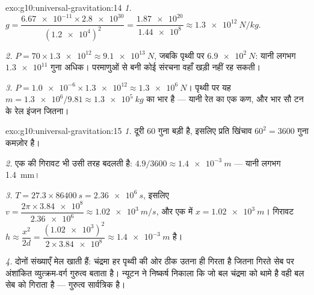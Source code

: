 \begin{solution}{exo:g10:universal-gravitation:14}
\emph{1.} $g = \dfrac{\num{6.67e-11} \times \num{2.8e30}}
{(\num{1.2e4})^2} = \dfrac{\num{1.87e20}}{\num{1.44e8}}
\approx \qty{1.3e12}{N/kg}.$

\emph{2.} $P = 70 \times \num{1.3e12} \approx \qty{9.1e13}{N}$, जबकि पृथ्वी पर $\qty{6.9e2}{N}$: यानी लगभग $\num{1.3e11}$ गुना अधिक।
परमाणुओं से बनी कोई संरचना वहाँ खड़ी नहीं रह सकती।

\emph{3.} $P = \num{1.0e-6} \times \num{1.3e12} \approx
\qty{1.3e6}{N}$। पृथ्वी पर यह $m = \num{1.3e6}/9.81 \approx \qty{1.3e5}{kg}$ का भार है --- यानी रेत का
एक कण, और भार सौ टन के रेल इंजन जितना।
\end{solution}

\begin{solution}{exo:g10:universal-gravitation:15}
\emph{1.} दूरी $60$ गुना बड़ी है, इसलिए प्रति 
खिंचाव $60^2 = 3600$ गुना कमज़ोर है।

\emph{2.} एक  की गिरावट भी उसी तरह बदलती है: $4.9/3600 \approx \qty{1.4e-3}{m}$ --- यानी लगभग
\qty{1.4}{mm}।

\emph{3.} $T = 27.3 \times \qty{86400}{s} = \qty{2.36e6}{s}$, इसलिए $v = \dfrac{2\pi \times \num{3.84e8}}{\num{2.36e6}} \approx
\qty{1.02e3}{m/s}$, और एक  में $x = \qty{1.02e3}{m}$। गिरावट
$h \approx \dfrac{x^2}{2d}
= \dfrac{(\num{1.02e3})^2}{2 \times \num{3.84e8}}
\approx \qty{1.4e-3}{m}$ है।

\emph{4.} दोनों संख्याएँ मेल खाती हैं: चंद्रमा हर  पृथ्वी की ओर ठीक
उतना ही गिरता है जितना गिरते सेब पर अंशांकित व्युत्क्रम-वर्ग गुरुत्व
बताता है। न्यूटन ने निष्कर्ष निकाला कि जो बल चंद्रमा को थामे है वही बल
सेब को गिराता है --- गुरुत्व सार्वत्रिक है।
\end{solution}

